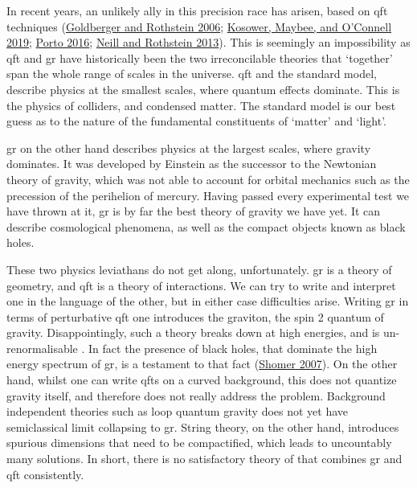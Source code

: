 \documentclass[
  11pt,
  a4paper,
  DIV=11,
  numbers=noendperiod,
  oneside]{scrreprt}
\DeclareRobustCommand{\[}{\begin{equation}}
\DeclareRobustCommand{\]}{\end{equation}}
\begin{document}
In recent years, an unlikely ally in this precision race has arisen,
based on \gls{qft} techniques
(\protect\hyperlink{ref-Goldberger:2004jt}{Goldberger and Rothstein
2006}; \protect\hyperlink{ref-Kosower:2018adc}{Kosower, Maybee, and
O'Connell 2019}; \protect\hyperlink{ref-Porto:2016pyg}{Porto 2016};
\protect\hyperlink{ref-Neill:2013wsa}{Neill and Rothstein 2013}). This
is seemingly an impossibility as \gls{qft} and \gls{gr} have
historically been the two irreconcilable theories that `together' span
the whole range of scales in the universe. \gls{qft} and the standard
model, describe physics at the smallest scales, where quantum effects
dominate. This is the physics of colliders, and condensed matter. The
standard model is our best guess as to the nature of the fundamental
constituents of `matter' and `light'.

\gls{gr} on the other hand describes physics at the largest scales,
where gravity dominates. It was developed by Einstein as the successor
to the Newtonian theory of gravity, which was not able to account for
orbital mechanics such as the precession of the perihelion of mercury.
Having passed every experimental test we have thrown at it, \gls{gr} is
by far the best theory of gravity we have yet. It can describe
cosmological phenomena, as well as the compact objects known as black
holes.

These two physics leviathans do not get along, unfortunately. \gls{gr}
is a theory of geometry, and \gls{qft} is a theory of interactions. We
can try to write and interpret one in the language of the other, but in
either case difficulties arise. Writing \gls{gr} in terms of
perturbative \gls{qft} one introduces the graviton, the spin 2 quantum
of gravity. Disappointingly, such a theory breaks down at high energies,
and is un-renormalisable . In fact the presence of black holes, that
dominate the high energy spectrum of \gls{gr}, is a testament to that
fact (\protect\hyperlink{ref-Shomer:2007vq}{Shomer 2007}). On the other
hand, whilst one can write \glspl{qft} on a curved background, this does
not quantize gravity itself, and therefore does not really address the
problem. Background independent theories such as loop quantum gravity
does not yet have semiclassical limit collapsing to \gls{gr}. String
theory, on the other hand, introduces spurious dimensions that need to
be compactified, which leads to uncountably many solutions. In short,
there is no satisfactory theory of that combines \gls{gr} and \gls{qft}
consistently.
\end{document}
